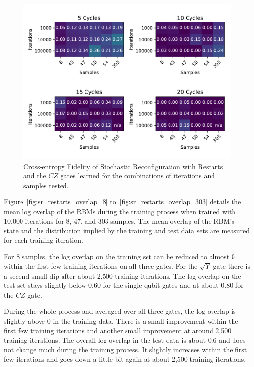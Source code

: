 \begin{figure}[H]
  \centering
  \includegraphics[width=\textwidth]{figures/results/SR-restarts-learned/fxeb_heatmap.pdf}
  \caption[Cross-entropy Fidelity of Stochastic Reconfiguration with Restarts Learned]{Cross-entropy Fidelity of Stochastic 
  Reconfiguration with Restarts and the $CZ$ gates learned for the combinations of iterations and samples tested.}
  \label{fig:sr_restarts_fxeb}
\end{figure}

Figure~\ref{fig:sr_restarts_overlap_8} to~\ref{fig:sr_restarts_overlap_303} details the mean log overlap of the RBMs during the 
training process when trained with 10,000 iterations for 8, 47, and 303 samples. The 
mean overlap of the RBM's state and the distribution implied by the training and test data sets are measured 
for each training iteration.

For 8 samples, the log overlap on the training set can be reduced to almost 0 within the first few training iterations 
on all three gates. For the $\sqrt{Y}$ gate there is a second small dip after about 2,500 training iterations. 
The log overlap on the test set stays slightly below $0.60$ for the single-qubit gates and at about $0.80$ for the 
$CZ$ gate. 

During the whole process and averaged over all three gates, the log overlap is slightly above $0$ in the training data. There is a small 
improvement within the first few training iterations and another small improvement at around 2,500 training iterations. 
The overall log overlap in the test data is about $0.6$ and does not change much during the training process. It 
slightly increases within the first few iterations and goes down a little bit again at about 2,500 training iterations.

